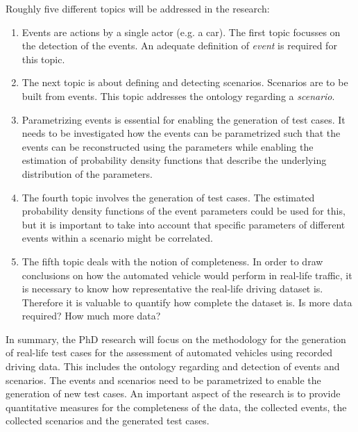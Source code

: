 \documentclass[10pt,final,a4paper,oneside,onecolumn]{article}
\begin{document}
Roughly five different topics will be addressed in the research:
\begin{enumerate}
	\item Events are actions by a single actor (e.g. a car). The first topic focusses on the detection of the events. An adequate definition of \emph{event} is required for this topic.
	\item The next topic is about defining and detecting scenarios. Scenarios are to be built from events. This topic addresses the ontology regarding a \emph{scenario}.
	\item Parametrizing events is essential for enabling the generation of test cases. It needs to be investigated how the events can be parametrized such that the events can be reconstructed using the parameters while enabling the estimation of probability density functions that describe the underlying distribution of the parameters.
	\item The fourth topic involves the generation of test cases. The estimated probability density functions of the event parameters could be used for this, but it is important to take into account that specific parameters of different events within a scenario might be correlated.
	\item The fifth topic deals with the notion of completeness. In order to draw conclusions on how the automated vehicle would perform in real-life traffic, it is necessary to know how representative the real-life driving dataset is. Therefore it is valuable to quantify how complete the dataset is. Is more data required? How much more data?
\end{enumerate}

In summary, the PhD research will focus on the methodology for the generation of real-life test cases for the assessment of automated vehicles using recorded driving data. This includes the ontology regarding and detection of events and scenarios. The events and scenarios need to be parametrized to enable the generation of new test cases. An important aspect of the research is to provide quantitative measures for the completeness of the data, the collected events, the collected scenarios and the generated test cases.

%
%
\end{document}
